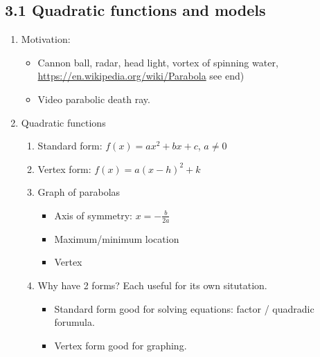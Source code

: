 \documentclass{article}
\begin{document}
\subsection{3.1 Quadratic functions and models}
\begin{enumerate}

\item Motivation:
\begin{itemize}
\item Cannon ball, radar, head light, vortex of spinning water, \url{https://en.wikipedia.org/wiki/Parabola} see end)
\item Video parabolic death ray.
\end{itemize}

\item Quadratic functions
\begin{enumerate}
\item Standard form: $f(x) = ax^2 + bx + c$, $a\neq 0$

\item Vertex form: $f(x) = a(x-h)^2 +k$

\item Graph of parabolas
\begin{itemize}
\item Axis of symmetry: $x=-\frac{b}{2a}$
\item Maximum/minimum location
\item Vertex
\end{itemize}

\item Why have 2 forms? Each useful for its own situtation.
\begin{itemize}
\item Standard form good for solving equations: factor / quadradic forumula.
\item Vertex form good for graphing.
\end{itemize}


\end{enumerate}
\end{enumerate}
\end{document}
